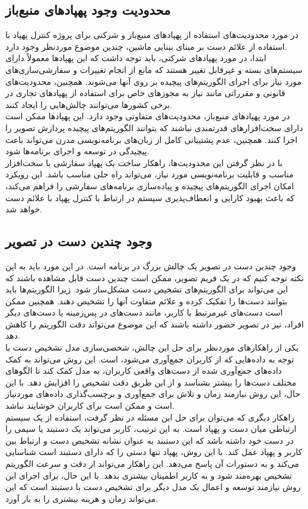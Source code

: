 \subsection{محدودیت وجود پهپاد‌های منبع‌باز}
در مورد محدودیت‌های استفاده از پهپادهای منبع‌باز و شرکتی برای پروژه کنترل پهپاد با استفاده از علائم دست بر مبنای بینایی ماشین، چندین موضوع موردنظر وجود دارد. 
\\
ابتدا، در مورد پهپادهای شرکتی، باید توجه داشت که این پهپادها معمولاً دارای سیستم‌های بسته و غیرقابل تغییر هستند که مانع از انجام تغییرات و سفارشی‌سازی‌های مورد نیاز برای اجرای الگوریتم‌های پیچیده بر روی آنها می‌شوند. همچنین، 
محدودیت‌های قانونی و مقرراتی مانند نیاز به مجوزهای خاص برای استفاده از پهپادهای تجاری در برخی کشورها می‌توانند چالش‌هایی را ایجاد کنند.
\\
در مورد پهپادهای منبع‌باز، محدودیت‌های متفاوتی وجود دارد. این پهپادها ممکن است دارای سخت‌افزارهای قدرتمندی نباشند که بتوانند الگوریتم‌های پیچیده پردازش تصویر را اجرا کنند. همچنین، عدم پشتیبانی کامل از زبان‌های برنامه‌نویسی مدرن می‌تواند باعث پیچیدگی در توسعه و اجرای برنامه‌ها شود.
\\
با در نظر گرفتن این محدودیت‌ها، راهکار ساخت یک پهپاد سفارشی با سخت‌افزار مناسب و قابلیت برنامه‌نویسی مورد نیاز، می‌تواند راه حلی مناسب باشد. این رویکرد امکان اجرای الگوریتم‌های پیچیده و پیاده‌سازی برنامه‌های سفارشی را فراهم می‌کند، که باعث بهبود کارایی و انعطاف‌پذیری سیستم در ارتباط با کنترل پهپاد با علائم دست خواهد شد.

\subsection{وجود چندین دست در تصویر}
وجود چندین دست در تصویر یک چالش بزرگ در برنامه است. در این مورد باید به این نکته توجه کنیم که در یک فریم تصویر، ممکن است چندین دست قابل مشاهده باشند که این می‌تواند برای الگوریتم‌های تشخیص دست مشکل‌ساز شود. زیرا 
الگوریتم‌ها باید بتوانند دست‌ها را تفکیک کرده و علائم متفاوت آنها را تشخیص دهند. همچنین ممکن است دست‌های غیرمرتبط با کاربر، مانند دست‌های در پس‌زمینه یا دست‌های دیگر افراد، نیز در تصویر حضور داشته باشند که این موضوع می‌تواند دقت الگوریتم را کاهش دهد.
\\
یکی از راهکارهای موردنظر برای حل این چالش، شخصی‌سازی مدل تشخیص دست با توجه به داده‌هایی که از کاربران جمع‌آوری می‌شود، است. این روش می‌تواند به کمک داده‌های جمع‌آوری شده از دست‌های واقعی کاربران، به مدل کمک 
کند تا الگوهای مختلف دست‌ها را بیشتر بشناسد و از این طریق دقت تشخیص را افزایش دهد. با این حال، این روش نیازمند زمان و تلاش برای جمع‌آوری و برچسب‌گذاری داده‌های موردنیاز است و ممکن است برای کاربران خوشایند نباشد.
\\
راهکار دیگری که می‌توان برای حل این مسئله در نظر گرفت، استفاده از یک سیستم ارتباطی میان دست و پهپاد است. به این ترتیب، کاربر می‌تواند یک دستبند یا سیمی را در دست خود داشته باشد که این دستبند به عنوان نشانه تشخیص دست و 
ارتباط بین کاربر و پهپاد عمل کند. با این روش، پهپاد تنها دستی را که دارای دستبند است شناسایی می‌کند و به دستورات آن پاسخ می‌دهد. این راهکار می‌تواند از دقت و سرعت الگوریتم تشخیص بهره‌مند شود و به کاربر اطمینان بیشتری بدهد. با 
این حال، برای اجرای این روش نیازمند توسعه و اعمال یک مدل دیگر برای تشخیص دست با دستبند است که این می‌تواند زمان و هزینه بیشتری را به بار آورد.



